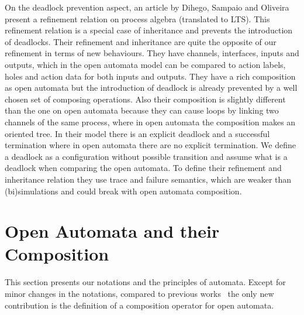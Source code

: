 \documentclass[runningheads]{llncs}
\begin{document}
On the deadlock prevention aspect, an article by Dihego, Sampaio and Oliveira \cite{DIHEGO2020110598} present a refinement relation on process algebra (translated to LTS).
This refinement relation is a special case of inheritance and prevents the introduction of deadlocks.
Their refinement and inheritance are quite the opposite of our refinement in terms of new behaviours.
They have channels, interfaces, inputs and outputs, which in the open automata model can be compared to action labels, holes and action data for both inputs and outputs.
They have a rich composition as open automata but the introduction of deadlock is already prevented by a well chosen set of composing operations.
Also their composition is slightly different than the one on open automata because they can cause loops by linking two channels of the same process, where in open automata the composition makes an oriented tree.
In their model there is an explicit deadlock and a successful termination where in open automata there are no explicit termination.
We define a deadlock as a configuration without possible transition and assume what is a deadlock when comparing the open automata.
To define their refinement and inheritance relation they use trace and failure semantics, which are weaker than (bi)simulations \cite{10.5555/640428.640430} and could break with open automata composition.


\section{Open Automata and their Composition}\label{sec:background}

This section presents our notations and the principles of automata. Except for minor changes in the notations, compared to previous works~\cite{pnets} the only new contribution is the definition of a composition operator for open automata.
%

\end{document}
